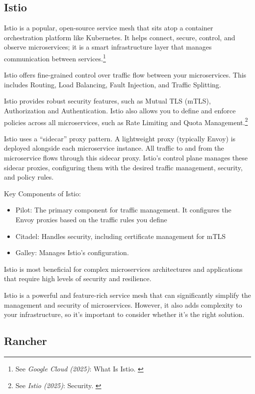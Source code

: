 \subsection{Istio}

Istio is a popular, open-source service mesh that sits atop a container
orchestration platform like Kubernetes. It helps connect, secure,
control, and observe microservices; it is a smart infrastructure layer
that manages communication between services.\footnote{See \textit{Google Cloud (2025)}: What Is Istio. \cite{whatIsIstio}}

Istio offers fine-grained control over traffic flow between your
microservices. This includes Routing, Load Balancing, Fault Injection,
and Traffic Splitting.

Istio provides robust security features, such as Mutual TLS (mTLS),
Authorization and Authentication. Istio also allows you to define and
enforce policies across all microservices, such as Rate Limiting and
Quota Management.\footnote{See \textit{Istio (2025)}: Security. \cite{istioSecurity}}

Istio uses a ``sidecar'' proxy pattern. A lightweight proxy (typically
Envoy) is deployed alongside each microservice instance. All traffic to
and from the microservice flows through this sidecar proxy. Istio's
control plane manages these sidecar proxies, configuring them with the
desired traffic management, security, and policy rules.

Key Components of Istio:

\begin{itemize}
	\item Pilot: The primary component for traffic management. It configures the Envoy proxies based on the traffic rules you define
	\item Citadel: Handles security, including certificate management for mTLS
	\item Galley: Manages Istio's configuration.
\end{itemize}

Istio is most beneficial for complex microservices architectures and
applications that require high levels of security and resilience.

Istio is a powerful and feature-rich service mesh that can significantly
simplify the management and security of microservices. However, it also
adds complexity to your infrastructure, so it's important to consider
whether it's the right solution.


\subsection{Rancher}

